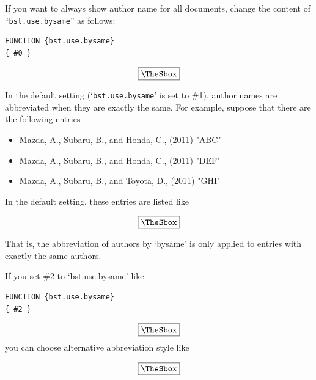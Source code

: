 \documentclass[10pt]{article}
\newenvironment{Frame}%
{\setlength{\fboxsep}{15pt}
\setlength{\mylength}{\linewidth}%
\addtolength{\mylength}{-2\fboxsep}%
\addtolength{\mylength}{-2\fboxrule}%
\Sbox
\minipage{\mylength}%
\setlength{\abovedisplayskip}{0pt}%
\setlength{\belowdisplayskip}{0pt}%
}%
{\endminipage\endSbox
\[\fbox{\TheSbox}\]}
\newcommand{\bysameline}{\hskip.3em \leavevmode\rule[.5ex]{3em}{.3pt}\hskip0.5em}
\begin{document}
If you want to always show author name for all documents, change the
content of ``\texttt{bst.use.bysame}'' as follows:
\begin{Frame}
\begin{verbatim}
FUNCTION {bst.use.bysame}
{ #0 }  
\end{verbatim}
\end{Frame}

In the default setting (`\texttt{bst.use.bysame}' is set to \#1), author names
are abbreviated when they are exactly the same. For example, suppose that there
are the following entries
\begin{itemize}
 \item Mazda, A., Subaru, B., and Honda, C., (2011) "ABC"
 \item Mazda, A., Subaru, B., and Honda, C., (2011) "DEF"
 \item Mazda, A., Subaru, B., and Toyota, D., (2011) "GHI"
\end{itemize}
\vspace*{1em}

In the default setting, these entries are listed like
\begin{Frame}
\end{Frame}

That is, the abbreviation of authors by `bysame' is only applied to
entries with exactly the same authors.

If you set \#2 to `bst.use.bysame' like
\begin{Frame}
\begin{verbatim}
FUNCTION {bst.use.bysame}
{ #2 }  
\end{verbatim}
\end{Frame}
you can choose alternative abbreviation style like
\begin{Frame}
\end{Frame}
\vspace*{1em}
\end{document}
